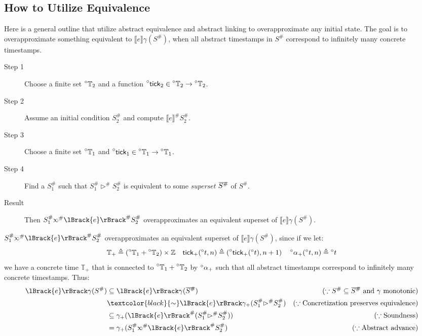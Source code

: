 \documentclass[acmsmall,review]{acmart}\settopmatter{printfolios=true,printccs=false,printacmref=false}
\theoremstyle{definition}
\theoremstyle{plain}
\def\ovbarw{1.2mu}
\def\ovbarh{1}
\newcommand*{\ovbar}[1]{\mkern \ovbarw\overline{\mkern-\ovbarw{\smash{#1}\scalebox{1}[\ovbarh]{\vphantom{i}}}\mkern-\ovbarw}\mkern \ovbarw}
\newcommand*{\A}[1]{\prescript{\circ}{}{#1}}
\newcommand*{\Abs}[1]{{#1}^{\#}}
\newcommand*{\Time}{\mathbb{T}}
\newcommand*{\ATime}{\A{\Time}}
\newcommand*{\semlink}{\mathbin{\rotatebox[origin=c]{180}{$\propto$}}}
\newcommand*{\equivalent}[1][black]{\textcolor{#1}{\sim}}
\newcommand*{\sembracket}[1]{\lBrack{#1}\rBrack}
\newcommand*{\tick}{\mathsf{tick}}
\begin{document}
\subsection{How to Utilize Equivalence}
Here is a general outline that utilize abstract equivalence and abstract linking to overapproximate any initial state.
The goal is to overapproximate something equivalent to $\sembracket{e}\gamma(\Abs{S})$, when all abstract timestamps in $\Abs{S}$ correspond to infinitely many concrete timestamps.
\begin{description}
  \item[Step 1] Choose a finite set $\A\Time_2$ and a function $\A\tick_2\in\A\Time_2\rightarrow\A\Time_2$.
  \item[Step 2] Assume an initial condition $\Abs{S}_2$ and compute $\Abs{\sembracket{e}}\Abs{S}_2$.
  \item[Step 3] Choose a finite set $\A\Time_1$ and $\A\tick_1\in\A\Time_1\rightarrow\A\Time_1$.
  \item[Step 4] Find a $\Abs{S}_1$ such that $\Abs{S}_1\Abs\rhd\Abs{S}_2$ is equivalent to some \emph{superset} $\ovbar{\Abs{S}}$ of $\Abs{S}$.
  \item[Result] Then $\Abs{S}_1\Abs\semlink\Abs{\sembracket{e}}\Abs{S}_2$ overapproximates an equivalent superset of $\sembracket{e}\gamma(\Abs{S})$.
\end{description}
$\Abs{S}_1\Abs\semlink\Abs{\sembracket{e}}\Abs{S}_2$ overapproximates an equivalent superset of $\sembracket{e}\gamma(\Abs{S})$, since if we let:
\[\Time_+\triangleq(\ATime_1+\ATime_2)\times\mathbb{Z}\quad\tick_+(\A{t},n)\triangleq(\A\tick_+(\A{t}),n+1)\quad\A\alpha_+(\A{t},n)\triangleq\A{t}\]
we have a concrete time $\Time_+$ that is connected to $\ATime_1+\ATime_2$ by $\A\alpha_+$ such that all abstract timestamps correspond to infinitely many concrete timestamps.
Thus:
\begin{align*}
  \sembracket{e}\gamma(\Abs{S}) & \subseteq\sembracket{e}\gamma(\ovbar{\Abs{S}})                      & (\because\Abs{S}\subseteq\ovbar{\Abs{S}}\text{ and }\gamma\text{ monotonic}) \\
                                & \equivalent\sembracket{e}\gamma_+(\Abs{S}_1\Abs\rhd\Abs{S}_2)       & (\because\text{Concretization preserves equivalence})                        \\
                                & \subseteq\gamma_+(\Abs{\sembracket{e}}(\Abs{S}_1\Abs\rhd\Abs{S}_2)) & (\because\text{Soundness})                                                   \\
                                & =\gamma_+(\Abs{S}_1\Abs\semlink\Abs{\sembracket{e}}\Abs{S}_2)       & (\because\text{Abstract advance})
\end{align*}
\end{document}
